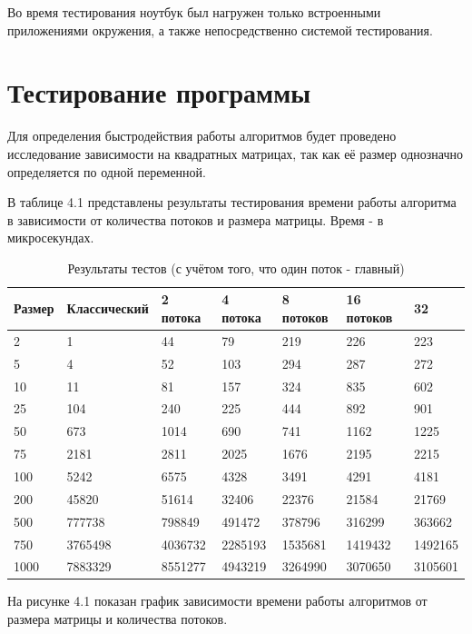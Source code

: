 Во время тестирования ноутбук был нагружен только встроенными приложениями окружения, а также непосредственно системой тестирования.

\section{Тестирование программы}
Для определения быстродействия работы алгоритмов будет проведено исследование зависимости
на квадратных матрицах, так как её размер однозначно определяется по одной переменной. 

В таблице 4.1 представлены результаты тестирования времени работы алгоритма в зависимости от количества потоков и размера матрицы.
Время - в микросекундах.

\FloatBarrier
\begin{table}[h]
	\caption{Результаты тестов (с учётом того, что один поток - главный)}
	\centering
	\begin{tabular}{ | l | l | l | l | l | l | l |}
		\hline
		Размер & Классический & 2 потока & 4 потока & 8 потоков & 16 потоков & 32 \\ \hline
		2 & 1 & 44 & 79 & 219 & 226 & 223 \\
		5 & 4 & 52 & 103 & 294 & 287 & 272\\
		10 & 11 & 81 & 157 &  324 & 835 & 602 \\
		25 & 104 & 240 & 225 & 444 & 892 & 901 \\
		50 & 673 & 1014 & 690 & 741 & 1162 & 1225 \\
		75 & 2181 & 2811 & 2025 & 1676 & 2195 & 2215 \\
		100 & 5242 & 6575 & 4328 & 3491 & 4291 & 4181\\
		200 & 45820 & 51614 & 32406 & 22376 & 21584 & 21769 \\
		500 & 777738 & 798849 & 491472 & 378796 & 316299 & 363662 \\
		750 &  3765498 & 4036732 & 2285193 & 1535681 & 1419432 & 1492165\\
		1000 & 7883329 & 8551277 & 4943219 & 3264990 & 3070650 & 3105601 \\
		\hline
	\end{tabular}
\end{table}
\FloatBarrier
На рисунке 4.1 показан график зависимости времени работы алгоритмов от размера матрицы и количества потоков.

